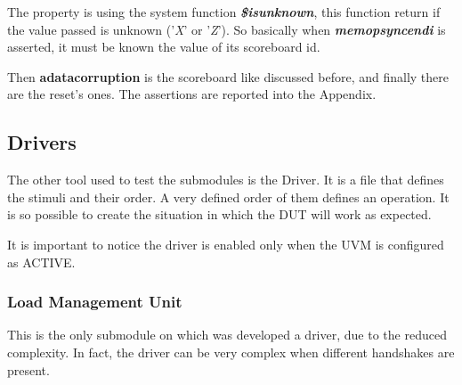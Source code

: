 The property is using the system function \textbf{\emph{\$isunknown}}, this function return if the value passed is unknown ('\emph{X}' or '\emph{Z}'). So basically when \textbf{\emph{memop\+sync\+end\+i}} is asserted, it must be known the value of its scoreboard id.


Then  \textbf{a\+data\+corruption} is the scoreboard like discussed before, and finally there are the reset's ones.
The assertions are reported into the Appendix.




\subsection{Drivers}
The other tool used to test the submodules is the Driver. It is a file that defines the stimuli and their order. A very defined order of them defines an operation. It is so possible to create the situation in which the DUT will work as expected.

It is important to notice the driver is enabled only when the UVM is configured as ACTIVE.

\subsubsection{Load Management Unit}
This is the only submodule on which was developed a driver, due to the reduced complexity. In fact, the driver can be very complex when different handshakes are present.

